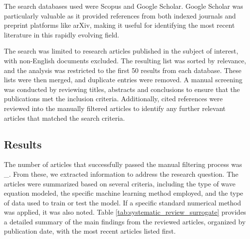 \documentclass[11pt,twoside]{article}
\begin{document}
\vspace*{2mm}

The search databases used were Scopus and Google Scholar. Google Scholar was particularly valuable as it 
provided references from both indexed journals and preprint platforms like arXiv, making it useful for 
identifying the most recent literature in this rapidly evolving field.

The search was limited to research articles published in the subject of interest, with non-English 
documents excluded. The resulting list was sorted by relevance, and the analysis was restricted to the 
first 50 results from each database. These lists were then merged, and duplicate entries were removed. 
A manual screening was conducted by reviewing titles, abstracts and conclusions to ensure that the 
publications met the inclusion criteria. Additionally, cited references were reviewed into the 
manually filtered articles to identify any further relevant articles that matched the search criteria.

\subsection*{Results}

The number of articles that successfully passed the manual filtering process was \_. From these, 
we extracted information to address the research question. The articles were summarized based 
on several criteria, including the type of wave equation modeled, the specific machine learning 
method employed, and the type of data used to train or test the model. If a specific standard 
numerical method was applied, it was also noted. Table \ref{tab:systematic_review_surrogate} 
provides a detailed summary of the main findings from the reviewed articles, organized by 
publication date, with the most recent articles listed first.
\end{document}

